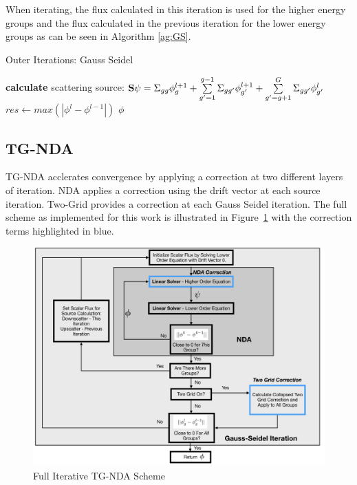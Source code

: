 When iterating, the flux calculated in this iteration is used for the higher energy groups and the flux calculated in the previous iteration for the lower energy groups as can be seen in Algorithm \ref{ag:GS}.
\begin{algorithm}
\caption{Outer Iterations: Gauss Seidel}
\begin{algorithmic}
     
            \State \textbf{calculate} scattering source: \State $ {\bf S} \psi = \Sigma_{gg}\phi_g^{l+1} + \sum\limits_{g'=1}^{g-1} \Sigma_{gg'} \phi_{g'}^{l+1} + \sum\limits_{g'=g+1}^G \Sigma_{gg'}\phi_{g'}^l$
        \EndProcedure
        \EndFor
        \State $res \gets max(|\phi^{l} - \phi^{l-1}|)$  
        \EndWhile
    \Return $\phi$
\end{algorithmic}
\label{ag:GS}
\end{algorithm}

\subsection{TG-NDA}
TG-NDA acclerates convergence by applying a correction at two different layers of iteration. NDA applies a correction using the drift vector at each source iteration. Two-Grid provides a correction at each Gauss Seidel iteration. The full scheme as implemented for this work is illustrated in Figure~\ref{fig:tgnda-graph} with the correction terms highlighted in blue. 

\begin{figure}[H]
    \centering
    \includegraphics[width=\textwidth]{fig/TGNDAchart.png}
    \caption{Full Iterative TG-NDA Scheme}
    \label{fig:tgnda-graph}
\end{figure}